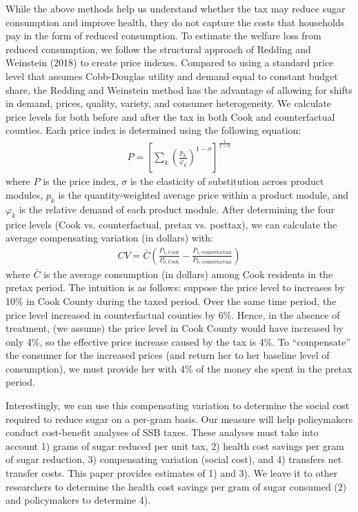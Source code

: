 \documentclass[12pt]{article}
\begin{document}
While the above methods help us understand whether the tax may reduce sugar consumption and improve health, they do not capture the costs that households pay in the form of reduced consumption. To estimate the welfare loss from reduced consumption, we follow the structural approach of Redding and Weinstein (2018) to create price indexes. Compared to using a standard price level that assumes Cobb-Douglas utility and demand equal to constant budget share, the Redding and Weinstein method has the advantage of allowing for shifts in demand, prices, quality, variety, and consumer heterogeneity. We calculate price levels for both before and after the tax in both Cook and counterfactual counties. Each price index is determined using the following equation:
\begin{align}
P = \left[ \sum_k \left( \frac{p_k}{\varphi_k}  \right)^{1-\sigma}  \right]^{\frac{1}{1-\sigma}} \label{priceindex}
\end{align}
where $P$ is the price index, $\sigma$ is the elasticity of substitution across product modules, $p_k$ is the quantity-weighted average price within a product module, and $\varphi_k$ is the relative demand of each product module. After determining the four price levels (Cook vs. counterfactual, pretax vs. posttax), we can calculate the average compensating variation (in dollars) with:
\begin{align}
CV = \bar{C}\left(\frac{P_{1,\text{Cook}}}{P_{0,\text{Cook}}} - \frac{P_{1,\text{counterfactual}}}{P_{0,\text{counterfactual}}}\right) \label{cv}
\end{align}
where $\bar{C}$ is the average consumption (in dollars) among Cook residents in the pretax period. The intuition is as follows: suppose the price level to increases by 10\% in Cook County during the taxed period. Over the same time period, the price level increased in counterfactual counties by 6\%. Hence, in the absence of treatment, (we assume) the price level in Cook County would have increased by only 4\%, so the effective price increase caused by the tax is 4\%. To ``compensate'' the consumer for the increased prices (and return her to her baseline level of consumption), we must provide her with 4\% of the money she spent in the pretax period.

Interestingly, we can use this compensating variation to determine the social cost required to reduce sugar on a per-gram basis. Our measure will help policymakers conduct cost-benefit analyses of SSB taxes. These analyses must take into account 1) grams of sugar reduced per unit tax, 2) health cost savings per gram of sugar reduction, 3) compensating variation (social cost), and 4) transfers net transfer costs. This paper provides estimates of 1) and 3). We leave it to other researchers to determine the health cost savings per gram of sugar consumed (2) and policymakers to determine 4).
\end{document}
